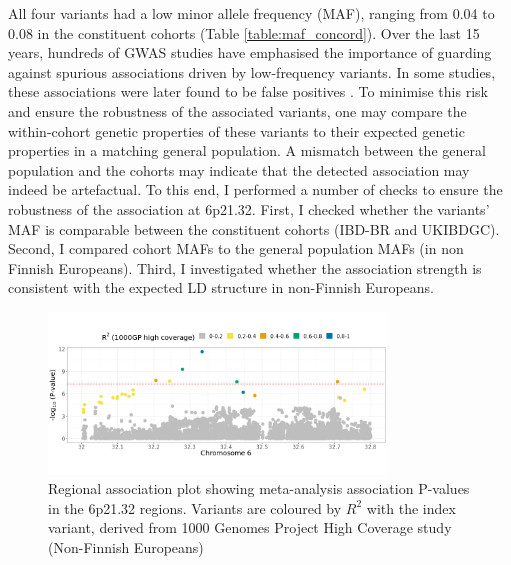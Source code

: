     All four variants had a low minor allele frequency (MAF), ranging from  0.04 to 0.08 in the constituent cohorts (Table \ref{table:maf_concord}). Over the last 15 years, hundreds of GWAS studies have emphasised the importance of guarding against spurious associations driven by low-frequency variants. In some studies, these associations were later found to be false positives \cite{Tabangin2009-gs}. To minimise this risk and ensure the robustness of the associated variants, one may compare the within-cohort genetic properties of these variants to their expected genetic properties in a matching general population. A mismatch between the general population and the cohorts may indicate that the detected association may indeed be artefactual. To this end, I performed a number of checks to ensure the robustness of the association at 6p21.32. First, I checked whether the variants' MAF is comparable between the constituent cohorts (IBD-BR and UKIBDGC). Second, I compared cohort MAFs to the general population MAFs (in non Finnish Europeans). Third, I investigated whether the association strength is consistent with the expected LD structure in non-Finnish Europeans. 
    \begin{figure}[H] 
      \centering    
      \includegraphics[width=0.8\textwidth]{Vector/regional_assoc_plot}
      \caption[Figure]{Regional association plot showing meta-analysis association P-values in the 6p21.32 regions. Variants are coloured by $R^{2}$ with the index variant, derived from 1000 Genomes Project High Coverage study (Non-Finnish Europeans)}
      \label{fig:regional_assoc_plot}
      \end{figure}
